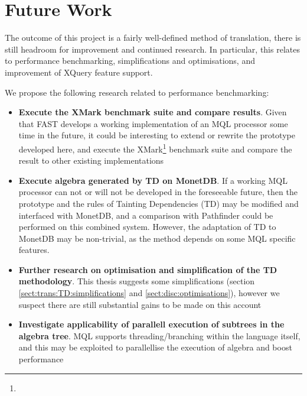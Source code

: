 \chapter{Future Work}
\label{chapter:future}

The outcome of this project is a fairly well-defined method of translation,
there is still headroom for improvement and continued research. In particular,
this relates to performance benchmarking, simplifications and optimisations,
and improvement of XQuery feature support.

We propose the following research related to performance benchmarking:
\begin{itemize}
  \item \textbf{Execute the XMark benchmark suite and compare results}. Given that FAST
  develops a working implementation of an MQL processor some time in the future, it could be interesting to extend or rewrite the
  prototype developed here, and execute the
  XMark\footnote{} 
  benchmark suite and compare the result to other existing implementations
  \item \textbf{Execute algebra generated by TD on MonetDB}. If a working MQL
  processor can not or will not be developed in the foreseeable future, then
  the prototype and the rules of Tainting Dependencies (TD) may be modified
  and interfaced with MonetDB, and a comparison with Pathfinder could be performed on this
  combined system. However, the adaptation of TD to MonetDB may be non-trivial, as the method depends on some MQL
  specific features.
  \item \textbf{Further research on optimisation and simplification of the TD
  methodology}. This thesis suggests some simplifications (section
  \ref{sect:trans:TD:simplifications} and \ref{sect:disc:optimisations}), however we suspect there are still
  substantial gains to be made on this account
  \item \textbf{Investigate applicability of parallell execution of subtrees in the
  algebra tree}. MQL supports threading/branching within the language itself,
  and this may be exploited to parallellise the execution of algebra and boost
  performance
\end{itemize}

